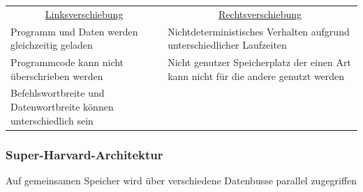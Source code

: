  \begin{tabular}{@{}p{}%
				@{}p{}}
	\multicolumn{1}{c}{\underline{Linksverschiebung}} & \multicolumn{1}{c}{\underline{Rechtsverschiebung}}\\
	Programm und Daten werden gleichzeitig geladen & Nichtdeterministisches Verhalten aufgrund unterschiedlicher Laufzeiten \\
	Programmcode kann nicht überschrieben werden & Nicht genutzer Speicherplatz der einen Art kann nicht für die andere genutzt werden \\
	Befehlswortbreite und Datenwortbreite können unterschiedlich sein & \\

\end{tabular}

\subsubsection{Super-Harvard-Architektur}
Auf gemeinsamen Speicher wird über verschiedene Datenbusse parallel zugegriffen
